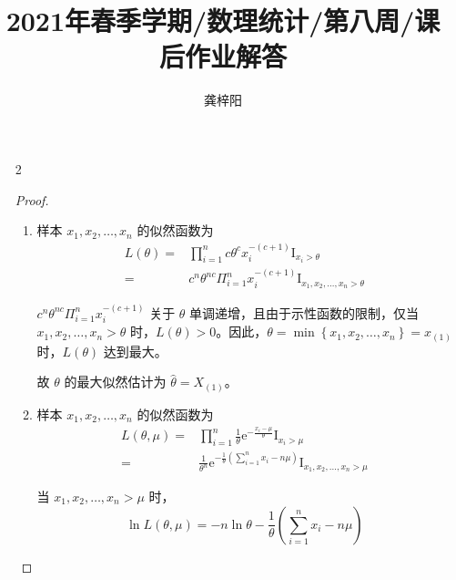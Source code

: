 \documentclass[normal,founder,mtpro2,cn]{elegantnote}
\title{2021年春季学期/数理统计/第八周/课后作业解答}
\author{龚梓阳}
\date{\zhtoday}
\begin{document}
\maketitle
\begin{enumerate}
    \item[2]
        \begin{proof}
            \begin{enumerate}
                \item
                      样本 $x_{1},x_{2},\ldots,x_{n}$ 的似然函数为
                      \begin{equation*}
                          \begin{aligned}
                              L(\theta)= & \prod_{i=1}^{n}c\theta^{c}x_{i}^{-(c+1)}\mathrm{I}_{x_{i}>\theta}                       \\
                              =          & c^{n}\theta^{nc}\Pi_{i=1}^{n}x_{i}^{-(c+1)}\mathrm{I}_{x_{1},x_{2},\ldots,x_{n}>\theta}
                          \end{aligned}
                      \end{equation*}

                      $c^{n}\theta^{nc}\Pi_{i=1}^{n}x_{i}^{-(c+1)}$ 关于 $\theta$ 单调递增，且由于示性函数的限制，仅当 $x_{1},x_{2},\ldots,x_{n}>\theta$ 时，$L(\theta)>0$。因此，$\theta=\min\left\{x_{1},x_{2},\ldots,x_{n}\right\}=x_{(1)}$ 时，$L(\theta)$ 达到最大。

                      故 $\theta$ 的最大似然估计为 $\hat{\theta}=X_{(1)}$。
                \item
                      样本 $x_{1},x_{2},\ldots,x_{n}$ 的似然函数为
                      \begin{equation*}
                          \begin{aligned}
                              L(\theta,\mu)= & \prod_{i=1}^{n}\frac{1}{\theta}\mathrm{e}^{-\frac{x_{i}-\mu}{\theta}}\mathrm{I}_{x_{i}>\mu}                                      \\
                              =              & \frac{1}{\theta^{n}}\mathrm{e}^{-\frac{1}{\theta}\left(\sum_{i=1}^{n}x_{i}-n\mu\right)}\mathrm{I}_{x_{1},x_{2},\ldots,x_{n}>\mu}
                          \end{aligned}
                      \end{equation*}

                      当 $x_{1},x_{2},\ldots,x_{n}>\mu$ 时，
                      \begin{equation*}
                          \ln L(\theta,\mu)=-n\ln\theta-\frac{1}{\theta}\left(\sum_{i=1}^{n}x_{i}-n\mu\right)
                      \end{equation*}


\end{enumerate}
\end{proof}
\end{enumerate}
\end{document}
